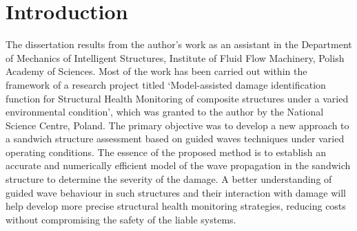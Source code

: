 

\chapter[Introduction]{Introduction}
\label{ch:intro}
The dissertation results from the author’s work as an assistant in the Department of Mechanics of Intelligent Structures, Institute of Fluid Flow Machinery, Polish Academy of Sciences.
Most of the work has been carried out within the framework of a research project titled ‘Model-assisted damage identification function for Structural Health Monitoring of composite structures under a varied environmental condition', which was granted to the author by the National Science Centre, Poland.
The primary objective was to develop a new approach to a sandwich structure assessment based on guided waves techniques under varied operating conditions.
The essence of the proposed method is to establish an accurate and numerically efficient model of the wave propagation in the sandwich structure to determine the severity of the damage.
A better understanding of guided wave behaviour in such structures and their interaction with damage will help develop more precise structural health monitoring strategies, reducing costs without compromising the safety of the liable systems.






